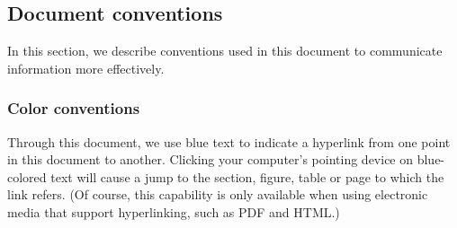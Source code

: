 






\subsection{Document conventions}
\label{sec:notation}

In this section, we describe conventions used in this document to
communicate information more effectively.


\subsubsection{Color conventions}
\label{sec:notation-color}

Through this document, we use blue text to indicate a hyperlink
from one point in this document to another.  Clicking your
computer's pointing device on blue-colored text will cause a jump
to the section, figure, table or page to which the link refers.
(Of course, this capability is only available when using
electronic media that support hyperlinking, such as PDF and HTML.)


